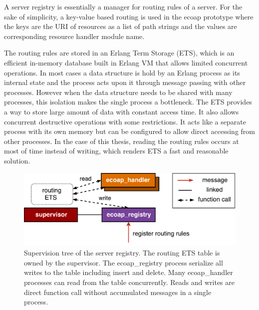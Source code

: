 A server registry is essentially a manager for routing rules of a server. For the sake of simplicity, a key-value based routing is used in the ecoap prototype where the keys are the URI of resources as a list of path strings and the values are corresponding resource handler module name. 

The routing rules are stored in an Erlang Term Storage (ETS), which is an efficient in-memory database built in Erlang VM that allows limited concurrent operations. In most cases a data structure is hold by an Erlang process as its internal state and the process acts upon it through message passing with other processes. However when the data structure needs to be shared with many processes, this isolation makes the single process a bottleneck. The ETS provides a way to store large amount of data with constant access time. It also allows concurrent destructive operations with some restrictions. It acts like a separate process with its own memory but can be configured to allow direct accessing from other processes. In the case of this thesis, reading the routing rules occurs at most of time instead of writing, which renders ETS a fast and reasonable solution. 

\begin{figure}[!htbp]
\centering
\includegraphics[scale = 0.55]{coap_registry}
\caption{Supervision tree of the server registry. The routing ETS table is owned by the supervisor. The ecoap\_registry process serialize all writes to the table including insert and delete. Many ecoap\_handler processes can read from the table concurrently. Reads and writes are direct function call without accumulated messages in a single process.}
\label{fig:coap_registry}
\end{figure}
 

